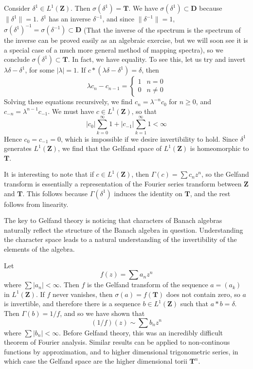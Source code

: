 \begin{example}
    Consider $\delta^1 \in L^1(\mathbf{Z})$. Then $\sigma(\delta^1) = \mathbf{T}$. We have $\sigma(\delta^1) \subset \mathbf{D}$ because $\| \delta^1 \| = 1$. $\delta^1$ has an inverse $\delta^{-1}$, and since $\| \delta^{-1} \| = 1$, $\sigma(\delta^1)^{-1} = \sigma(\delta^{-1}) \subset \mathbf{D}$ (That the inverse of the spectrum is the spectrum of the inverse can be proved easily as an algebraic exercise, but we will soon see it is a special case of a much more general method of mapping spectra), so we conclude $\sigma(\delta^1) \subset \mathbf{T}$. In fact, we have equality. To see this, let us try and invert $\lambda \delta - \delta^1$, for some $|\lambda| = 1$. If $c * (\lambda \delta - \delta^1) = \delta$, then
    \[ \lambda c_n - c_{n-1} = \begin{cases} 1 & n = 0 \\ 0 & n \neq 0 \end{cases} \]
    Solving these equations recursively, we find $c_n = \lambda^{-n} c_0$ for $n \geq 0$, and $c_{-n} = \lambda^{n-1} c_{-1}$. We must have $c \in L^1(\mathbf{Z})$, so that
    \[ |c_0| \sum_{k = 0}^\infty 1 + |c_{-1}| \sum_{k = 1}^\infty 1 < \infty \]
    Hence $c_0 = c_{-1} = 0$, which is impossible if we desire invertibility to hold. Since $\delta^1$ generates $L^1(\mathbf{Z})$, we find that the Gelfand space of $L^1(\mathbf{Z})$ is homeomorphic to $\mathbf{T}$.

    It is interesting to note that if $c \in L^1(\mathbf{Z})$, then $\Gamma(c) = \sum c_n z^n$, so the Gelfand transform is essentially a representation of the Fourier series transform between $\mathbf{Z}$ and $\mathbf{T}$. This follows because $\Gamma(\delta^1)$ induces the identity on $\mathbf{T}$, and the rest follows from linearity.
\end{example}

The key to Gelfand theory is noticing that characters of Banach algebras naturally reflect the structure of the Banach algebra in question. Understanding the character space leads to a natural understanding of the invertibility of the elements of the algebra.

\begin{example}
    Let
    \[ f(z) = \sum a_n z^n \]
    where $\sum |a_n| < \infty$. Then $f$ is the Gelfand transform of the sequence $a = (a_k)$ in $L^1(\mathbf{Z})$. If $f$ never vanishes, then $\sigma(a) = f(\mathbf{T})$ does not contain zero, so $a$ is invertible, and therefore there is a sequence $b \in L^1(\mathbf{Z})$ such that $a * b = \delta$. Then $\Gamma(b) = 1/f$, and so we have shown that
    \[ (1/f)(z) \sim \sum b_n z^n \]
    where $\sum |b_n| < \infty$. Before Gelfand theory, this was an incredibly difficult theorem of Fourier analysis. Similar results can be applied to non-continous functions by approximation, and to higher dimensional trigonometric series, in which case the Gelfand space are the higher dimensional torii $\mathbf{T}^n$.
\end{example}

